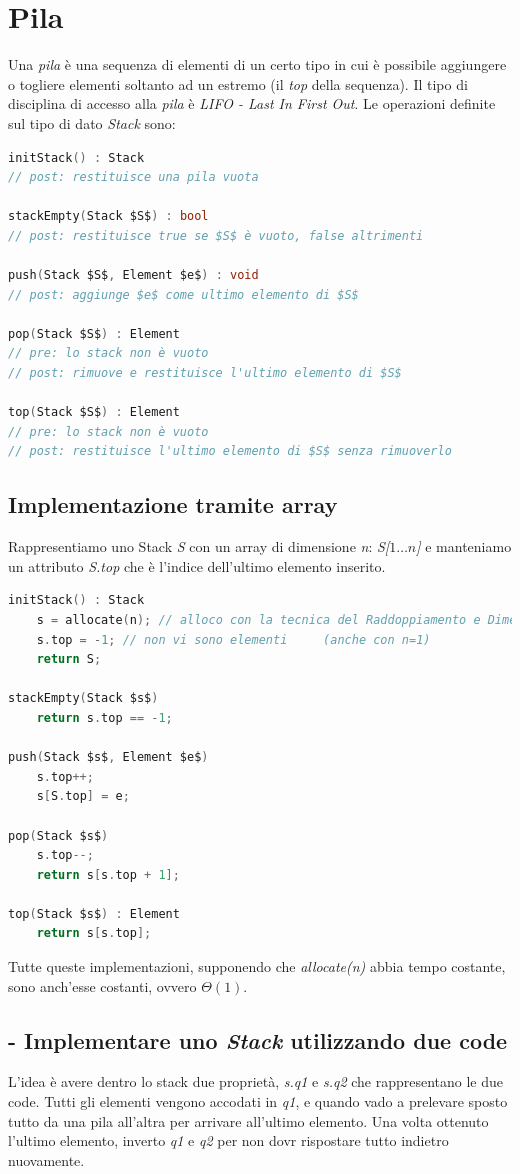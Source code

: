 \documentclass[italian]{article}
\newcommand{\dateright}[1]{\normalfont{\normalsize{\hfill #1 \\}}}
\newcommand{\homeExercize}{\text{\faHome $\;$ Esercizio per casa}}
\begin{document}
\section{Pila}
\dateright{2 Novembre 2016}
Una \textit{pila} è una sequenza di elementi di un certo tipo in cui è possibile aggiungere o togliere elementi soltanto ad un estremo (il \textit{top} della sequenza). Il tipo di disciplina di accesso alla \textit{pila} è \textit{LIFO - Last In First Out}. Le operazioni definite sul tipo di dato \textit{Stack} sono:
\begin{lstlisting}[language=c,mathescape=true]
initStack() : Stack
// post: restituisce una pila vuota

stackEmpty(Stack $S$) : bool
// post: restituisce true se $S$ è vuoto, false altrimenti

push(Stack $S$, Element $e$) : void
// post: aggiunge $e$ come ultimo elemento di $S$

pop(Stack $S$) : Element
// pre: lo stack non è vuoto
// post: rimuove e restituisce l'ultimo elemento di $S$

top(Stack $S$) : Element
// pre: lo stack non è vuoto
// post: restituisce l'ultimo elemento di $S$ senza rimuoverlo
\end{lstlisting}
\subsection{Implementazione tramite array}
Rappresentiamo uno Stack \textit{S} con un array di dimensione \textit{n}: \textit{S[$1\dots n$]} e manteniamo un attributo \textit{S.top} che è l'indice dell'ultimo elemento inserito.
\begin{lstlisting}[language=c,mathescape=true]
initStack() : Stack
	s = allocate(n); // alloco con la tecnica del Raddoppiamento e Dimezzamento 
	s.top = -1; // non vi sono elementi		(anche con n=1)
	return S;

stackEmpty(Stack $s$)
	return s.top == -1;

push(Stack $s$, Element $e$)
	s.top++;
	s[S.top] = e;

pop(Stack $s$)
	s.top--;
	return s[s.top + 1];

top(Stack $s$) : Element
	return s[s.top];
\end{lstlisting}
Tutte queste implementazioni, supponendo che \textit{allocate(n)} abbia tempo costante, sono anch'esse costanti, ovvero $\varTheta(1)$.
\pagebreak
\subsection{\homeExercize - Implementare uno \textit{Stack} utilizzando due code}
L'idea è avere dentro lo stack due proprietà, \textit{s.q1} e \textit{s.q2} che rappresentano le due code. Tutti gli elementi vengono accodati in \textit{q1}, e quando vado a prelevare sposto tutto da una pila all'altra per arrivare all'ultimo elemento. Una volta ottenuto l'ultimo elemento, inverto \textit{q1} e \textit{q2} per non dovr rispostare tutto indietro nuovamente.
\end{document}
